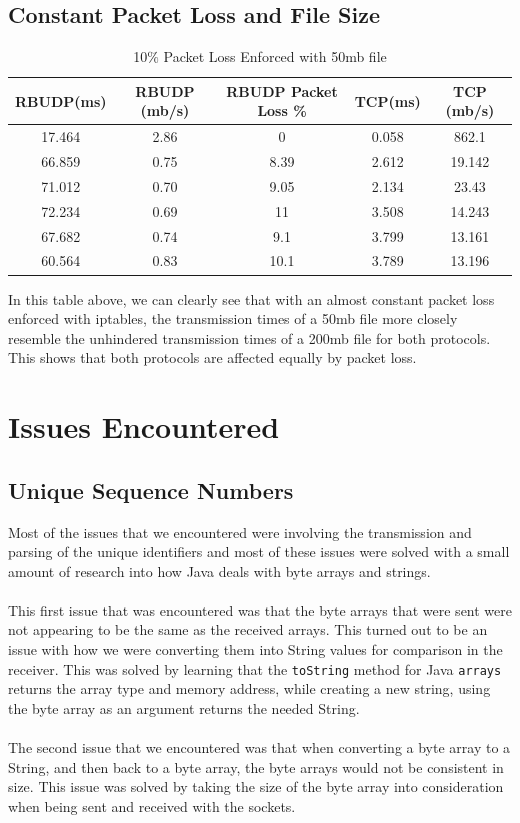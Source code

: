 \documentclass[13pt]{article}
\begin{document}
\subsection{Constant Packet Loss and File Size}

\begin{table}
\caption{10$\%$ Packet Loss Enforced with 50mb file}
\begin{center}
\begin{tabular}{|c|c|c|c|c|}
\hline RBUDP(ms) & RBUDP (mb/s) & RBUDP Packet Loss \% & TCP(ms) & TCP (mb/s) \\
\hline 17.464 &2.86&0   &0.058 & 862.1 \\
\hline 66.859 &0.75&8.39&2.612 & 19.142\\
\hline 71.012 &0.70&9.05&2.134 & 23.43 \\
\hline 72.234 &0.69&11  &3.508 & 14.243\\
\hline 67.682 &0.74&9.1 &3.799 & 13.161\\
\hline 60.564 &0.83&10.1&3.789 & 13.196\\
\hline
\end{tabular}
\end{center}
\end{table}

In this table above, we can clearly see that with an almost constant packet loss
enforced with iptables, the transmission times of a 50mb file more closely
resemble the unhindered transmission times of a 200mb file for both protocols.
This shows that both protocols are affected equally by packet loss.

\section{Issues Encountered}

\subsection{Unique Sequence Numbers}

Most of the issues that we encountered were involving the transmission and
parsing of the unique identifiers and most of these issues were solved with a
small amount of research into how Java deals with byte arrays and strings.
\\\\
This first issue that was encountered was that the byte arrays that were sent
were not appearing to be the same as the received arrays. This turned out to be
an issue with how we were converting them into String values for comparison in
the receiver. This was solved by learning that the \texttt{toString} method for
Java \texttt{arrays} returns the array type and memory address, while creating a
new string, using the byte array as an argument returns the needed String.
\\\\
The second issue that we encountered was that when converting a byte array to a
String, and then back to a byte array, the byte arrays would not be consistent
in size. This issue was solved by taking the size of the byte array into
consideration when being sent and received with the sockets.
\end{document}
